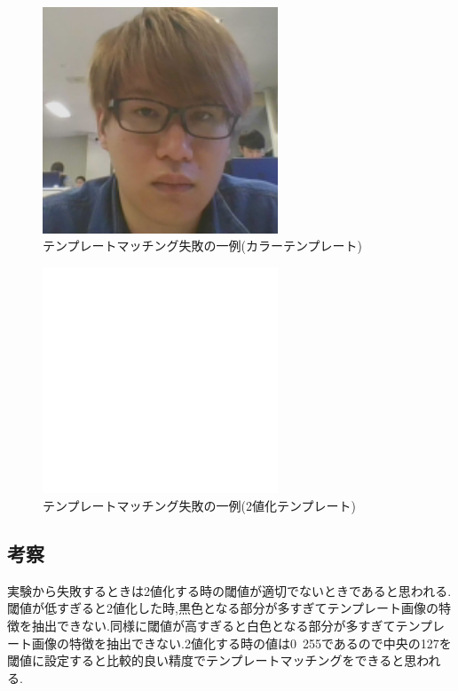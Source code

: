 \documentclass{jarticle}
\begin{document}
\begin{figure}[H]
\begin{center}
\includegraphics[width=7.0cm]{cv_kadai02/fail-temp-color.png}
\caption{テンプレートマッチング失敗の一例(カラーテンプレート)}
\label{fig:cvkadai02-fail-temp-color}
\end{center}
\end{figure}


\begin{figure}[H]
\begin{center}
\includegraphics[width=7.0cm]{cv_kadai02/fail-temp-mono.png}
\caption{テンプレートマッチング失敗の一例(2値化テンプレート)}
\label{fig:cvkadai02-fail-temp-mono}
\end{center}
\end{figure}


\subsection{考察}
実験から失敗するときは2値化する時の閾値が適切でないときであると思われる.閾値が低すぎると2値化した時,黒色となる部分が多すぎてテンプレート画像の特徴を抽出できない.同様に閾値が高すぎると白色となる部分が多すぎてテンプレート画像の特徴を抽出できない.2値化する時の値は0~255であるので中央の127を閾値に設定すると比較的良い精度でテンプレートマッチングをできると思われる.
\end{document}
